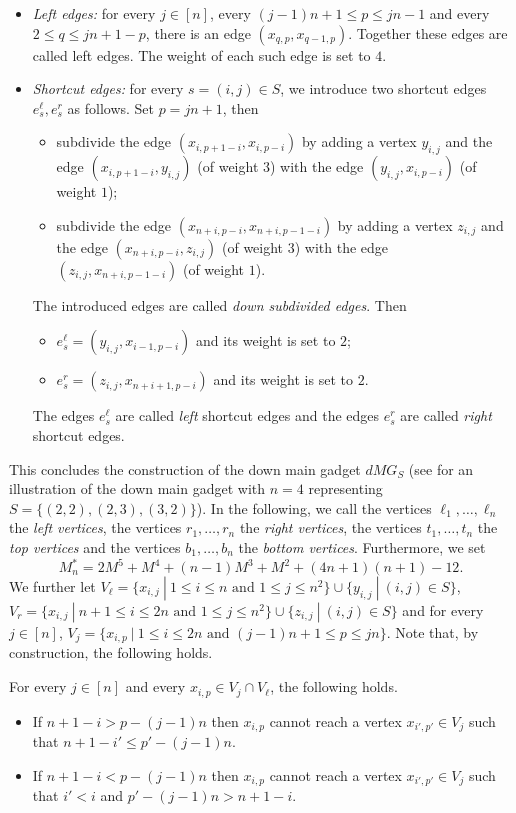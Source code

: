 \begin{itemize}
\item \emph{Left edges:} for every $j \in [n]$, every $(j-1)n+1 \leq p \leq jn-1$ and every $2 \leq q \leq jn+1-p$, there is an edge $(x_{q,p},x_{q-1,p})$. Together these edges are called left edges. The weight of each such edge is set to $4$.
\item \emph{Shortcut edges:} for every $s=(i,j) \in S$, we introduce two shortcut edges $e^\ell_s,e^r_s$ as follows. Set $p = jn+1$, then
\begin{itemize}
\item subdivide the edge $(x_{i,p+1-i},x_{i,p-i})$ by adding a vertex $y_{i,j}$ and the edge $(x_{i,p+1-i},y_{i,j})$ (of weight $3$) with the edge $(y_{i,j},x_{i,p-i})$ (of weight $1$);
\item subdivide the edge $(x_{n+i,p-i},x_{n+i,p-1-i})$ by adding a vertex $z_{i,j}$ and the edge $(x_{n+i,p-i},\allowbreak
z_{i,j})$ (of weight $3$) with the edge $(z_{i,j},x_{n+i,p-1-i})$ (of weight $1$). 
\end{itemize}
The introduced edges are called \emph{down subdivided edges}. Then
\begin{itemize}
\item $e^\ell_s= (y_{i,j},x_{i-1,p-i})$ and its weight is set to $2$;
\item $e^r_s = (z_{i,j},x_{n+i+1,p-i})$ and its weight is set to $2$.
\end{itemize}
The edges $e^\ell_s$ are called \emph{left} shortcut edges and the edges $e^r_s$ are called \emph{right} shortcut edges.  
\end{itemize}
This concludes the construction of the down main gadget $dMG_S$ (see  for an illustration of the down main gadget with $n=4$ representing $S= \{(2,2),(2,3),(3,2)\}$). In the following, we call the vertices $\ell_1,\ldots,\ell_n$ the \emph{left vertices}, the vertices $r_1,\ldots,r_n$ the \emph{right vertices}, the vertices $t_1,\ldots,t_n$ the \emph{top vertices} and the vertices $b_1,\ldots,b_n$ the \emph{bottom vertices}. Furthermore, we set
\[
M_n^* = 2M^5 + M^4 + (n-1)M^3 + M^2 + (4n+1)(n+1) - 12.
\] 
We further let $V_\ell = \{x_{i,j}~|~1 \leq i \leq n \text{ and } 1 \leq j \leq n^2\} \cup \{y_{i,j}~|~(i,j) \in S\}$, $V_r = \{x_{i,j}~|~n+1 \leq i \leq 2n \text{ and } 1 \leq j \leq n^2\} \cup \{z_{i,j}~|~(i,j) \in S\}$ and for every $j \in [n]$, $V_j = \{x_{i,p}~|~1 \leq i \leq 2n \text{ and } (j-1)n + 1 \leq p \leq jn\}$. Note that, by construction, the following holds.

\begin{observation}
\label{obs:reach}
For every $j \in [n]$ and every $x_{i,p} \in V_j \cap V_\ell$, the following holds.
\begin{itemize}
\item If $n+1-i > p - (j-1)n$ then $x_{i,p}$ cannot reach a vertex $x_{i',p'} \in V_j$ such that $n+1-i' \leq p' - (j-1)n$.
\item If $n+1-i < p - (j-1)n$ then $x_{i,p}$ cannot reach a vertex $x_{i',p'} \in V_j$ such that $i' < i$ and $p' - (j-1)n > n+1-i$.
\end{itemize}
\end{observation}

